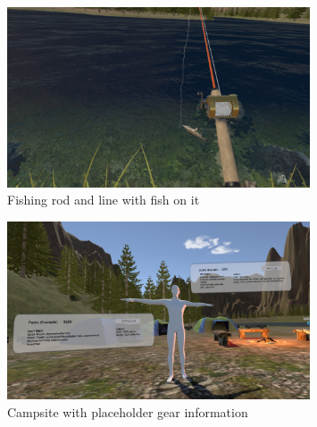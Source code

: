 \documentclass[10pt,journal,compsoc,onecolumn, draftclsnofoot]{IEEEtran}
\begin{document}
\begin{figure}[h]
    \centering
    \includegraphics[width=0.8\textwidth]{fishOnLine.png}
    \caption{Fishing rod and line with fish on it}
\end{figure}

\begin{figure}[h]
    \centering
    \includegraphics[width=0.8\textwidth]{gearPrototype.png}
    \caption{Campsite with placeholder gear information}
\end{figure}

% 
% 
\end{document}
